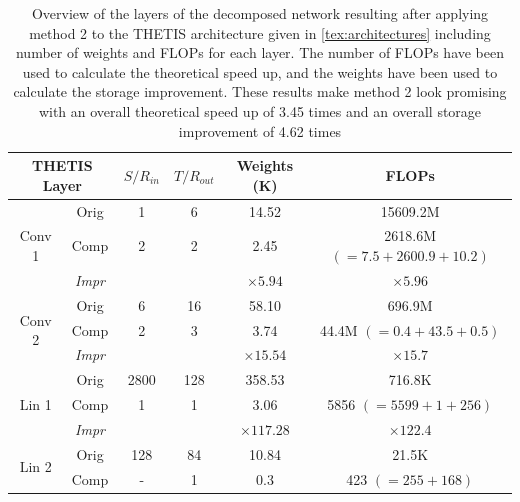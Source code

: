 \begin{table}
\small
\centering
\caption{Overview of the layers of the decomposed network resulting after applying method 2 to the THETIS architecture given in \autoref{tex:architectures} including number of weights and FLOPs for each layer. The number of FLOPs have been used to calculate the theoretical speed up, and the weights have been used to calculate the storage improvement. These results make method 2 look promising with an overall theoretical speed up of 3.45 times and an overall storage improvement of 4.62 times}
\label{tab:res_THETIS_FLOPs}
\begin{tabular}{cc|cccc}
\multicolumn{2}{c}{\textbf{THETIS Layer}}      & $ S / R_{in}$ & $ T /R_{out}$ & Weights (K)      & FLOPs                        \\ \hline
\multirow{3}{*}{Conv 1} & Orig          & 1             & 6             & 14.52            & 15609.2M                     \\
                        & Comp          & 2             & 2             & 2.45             & 2618.6M $(=7.5+2600.9+10.2)$ \\
                        & \textit{Impr} &               &               & $\times 5.94 $   & $\times 5.96 $               \\ \hline
\multirow{3}{*}{Conv 2} & Orig          & 6             & 16            & 58.10            & 696.9M                       \\
                        & Comp          & 2             & 3             & 3.74             & 44.4M $(=0.4+43.5+0.5)$      \\
                        & \textit{Impr} &               &               & $\times 15.54 $  & $\times 15.7$                \\ \hline
\multirow{3}{*}{Lin 1}  & Orig          & 2800          & 128           & 358.53           & 716.8K                       \\
                        & Comp          & 1             & 1             & 3.06             & 5856 $(=5599+1+256)$          \\
                        & \textit{Impr} &               &               & $\times 117.28 $ & $\times 122.4 $              \\ \hline
\multirow{3}{*}{Lin 2}  & Orig          & 128           & 84            & 10.84            & 21.5K                        \\
                        & Comp          & -             & 1             & 0.3              & 423 $(=255+168)$              \\

\end{tabular}
\end{table}
